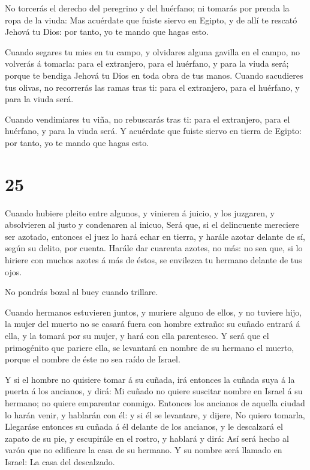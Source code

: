  No torcerás el derecho del peregrino y del huérfano; ni
tomarás por prenda la ropa de la viuda:  Mas acuérdate que
fuiste siervo en Egipto, y de allí te rescató Jehová tu Dios: por tanto,
yo te mando que hagas esto.

 Cuando segares tu mies en tu campo, y olvidares alguna
gavilla en el campo, no volverás á tomarla: para el extranjero, para el
huérfano, y para la viuda será; porque te bendiga Jehová tu Dios en toda
obra de tus manos.  Cuando sacudieres tus olivas, no
recorrerás las ramas tras ti: para el extranjero, para el huérfano, y
para la viuda será.

 Cuando vendimiares tu viña, no rebuscarás tras ti: para el
extranjero, para el huérfano, y para la viuda será.  Y
acuérdate que fuiste siervo en tierra de Egipto: por tanto, yo te mando
que hagas esto.

\hypertarget{section-24}{%
\section{25}\label{section-24}}

 Cuando hubiere pleito entre algunos, y vinieren á juicio, y
los juzgaren, y absolvieren al justo y condenaren al inicuo,
 Será que, si el delincuente mereciere ser azotado, entonces
el juez lo hará echar en tierra, y harále azotar delante de sí, según su
delito, por cuenta.  Harále dar cuarenta azotes, no más: no
sea que, si lo hiriere con muchos azotes á más de éstos, se envilezca tu
hermano delante de tus ojos.

 No pondrás bozal al buey cuando trillare.

 Cuando hermanos estuvieren juntos, y muriere alguno de
ellos, y no tuviere hijo, la mujer del muerto no se casará fuera con
hombre extraño: su cuñado entrará á ella, y la tomará por su mujer, y
hará con ella parentesco.  Y será que el primogénito que
pariere ella, se levantará en nombre de su hermano el muerto, porque el
nombre de éste no sea raído de Israel.

 Y si el hombre no quisiere tomar á su cuñada, irá entonces
la cuñada suya á la puerta á los ancianos, y dirá: Mi cuñado no quiere
suscitar nombre en Israel á su hermano; no quiere emparentar conmigo.
 Entonces los ancianos de aquella ciudad lo harán venir, y
hablarán con él: y si él se levantare, y dijere, No quiero tomarla,
 Llegaráse entonces su cuñada á él delante de los ancianos,
y le descalzará el zapato de su pie, y escupirále en el rostro, y
hablará y dirá: Así será hecho al varón que no edificare la casa de su
hermano.  Y su nombre será llamado en Israel: La casa del
descalzado.

